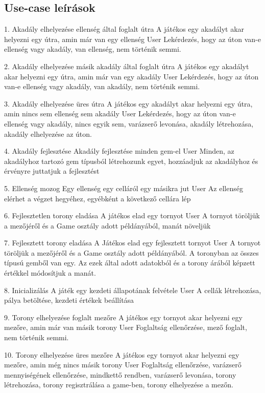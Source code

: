 \subsection{Use-case leírások}

\usecase
{1. Akadály elhelyezése ellenség által foglalt útra}
{A játékos egy akadályt akar helyezni egy útra, amin már van egy ellenség}
{User}
{Lekérdezés, hogy az úton van-e ellenség vagy akadály, van ellenség, nem történik semmi.}

\usecase
{2. Akadály elhelyezése másik akadály által foglalt útra}
{A játékos egy akadályt akar helyezni egy útra, amin már van egy akadály}
{User}
{Lekérdezés, hogy az úton van-e ellenség vagy akadály, van akadály, nem történik semmi.}

\usecase
{3. Akadály elhelyezése üres útra}
{A játékos egy akadályt akar helyezni egy útra, amin nincs sem ellenség sem akadály}
{User}
{Lekérdezés, hogy az úton van-e ellenség vagy akadály, nincs egyik sem, varázserő levonása, akadály létrehozása, akadály elhelyezése az úton.}

\usecase
{4. Akadály fejlesztése}
{Akadály fejlesztése minden gem-el}
{User}
{Minden, az akadályhoz tartozó gem típusból létrehozunk egyet, hozzáadjuk az akadályhoz és érvényre juttatjuk a fejlesztést}

\usecase
{5. Ellenség mozog}
{Egy ellenség egy celláról egy másikra jut}
{User}
{Az ellenség elérhet a végzet hegyéhez, egyébként a következő cellára lép}

\usecase
{6. Fejlesztetlen torony eladása}
{A játékos elad egy tornyot}
{User}
{A tornyot töröljük a mezőjéről és a Game osztály adott példányából, manát növeljük}

\usecase
{7. Fejlesztett torony eladása}
{A Játékos elad egy fejlesztett tornyot}
{User}
{A tornyot töröljük a mezőjéről és a Game osztály adott példányából. A toronyban az összes típusú gemből van egy. Az ezek által adott adatokból és a torony árából képzett értékkel módosítjuk a manát.}

\usecase
{8. Inicializálás}
{A játék egy kezdeti állapotának felvétele}
{User}
{A cellák létrehozása, pálya betöltése, kezdeti értékek beállítása }

\usecase
{9. Torony elhelyezése foglalt mezőre}
{A játékos egy tornyot akar helyezni egy mezőre, amin már van másik torony}
{User}
{Foglaltság ellenőrzése, mező foglalt, nem történik semmi.}

\usecase
{10. Torony elhelyezése üres mezőre}
{A játékos egy tornyot akar helyezni egy mezőre, amin még nincs másik torony}
{User}
{Foglaltság ellenőrzése, varázserő mennyiségének ellenőrzése, mindkettő rendben, varázserő levonása, torony létrehozása, torony regisztrálása a game-ben, torony elhelyezése a mezőn.}

